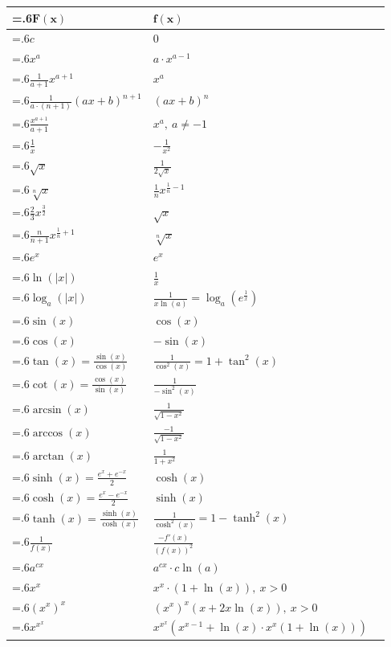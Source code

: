 \documentclass[a4paper, 10pt]{article}
\theoremstyle{definition}
\theoremstyle{ex}
\theoremstyle{named}
\begin{document}
\begin{tabularx}{\linewidth}{>{\hsize=.6\hsize\centering\arraybackslash}X|>{\centering\arraybackslash}XX}
    $\mathbf{F(x)}$ & $\mathbf{f(x)}$ \\
    \midrule
    $c$ & $0$ \\
    $x^a$ & $a \cdot x^{a - 1}$ \\
    $\frac{1}{a+1} x^{a + 1}$ & $x^a$ \\
    $\frac{1}{a \cdot (n + 1)} (ax + b)^{n + 1}$ & $(ax + b)^n$ \\
    $\frac{x^{a + 1}}{a + 1}$ & $x^a, \ a \neq -1$ \\
    $\frac{1}{x}$ & $-\frac{1}{x^2}$ \\
    $\sqrt{x}$ & $\frac{1}{2\sqrt{x}}$ \\
    $\sqrt[n]{x}$ & $\frac{1}{n}x^{\frac{1}{n} - 1}$ \\
    $\frac{2}{3}x^{\frac{3}{2}}$ & $\sqrt{x}$ \\
    $\frac{n}{n+1} x^{\frac{1}{n} + 1}$ & $\sqrt[n]{x}$ \\
    $e^x$ & $e^x$ \\
    $\ln(|x|)$ & $\frac{1}{x}$ \\
    $\log_a(|x|)$ & $\frac{1}{x \ln(a)} = \log_a(e^\frac{1}{x})$ \\
    $\sin(x)$ & $\cos(x)$ \\
    $\cos(x)$ & $-\sin(x)$ \\
    $\tan(x) = \frac{\sin(x)}{\cos(x)}$ & $\frac{1}{\cos^2(x)} = 1 + \tan^2(x)$ \\
    $\cot(x) = \frac{\cos(x)}{\sin(x)}$ & $\frac{1}{-\sin^2(x)}$ \\
    $\arcsin(x)$ & $\frac{1}{\sqrt{1 - x^2}}$ \\
    $\arccos(x)$ & $\frac{-1}{\sqrt{1 - x^2}}$ \\
    $\arctan(x)$ & $\frac{1}{1 + x^2}$ \\
    $\sinh(x) = \frac{e^x + e^{-x}}{2}$ & $\cosh(x)$ \\
    $\cosh(x) = \frac{e^x - e^{-x}}{2}$ & $\sinh(x)$ \\
    $\tanh(x) = \frac{\sinh(x)}{\cosh(x)}$ & $\frac{1}{\cosh^2(x)} = 1 - \tanh^2(x)$ \\
    $\frac{1}{f(x)}$ & $\frac{-f'(x)}{(f(x))^2}$ \\
    $a^{cx}$ & $a^{cx} \cdot c \ln(a)$ \\
    $x^x$ & $x^x \cdot (1 + \ln(x)), \ x > 0$ \\
    $(x^x)^x$ & $(x^x)^x (x + 2x \ln(x)), \ x > 0$ \\
    $x^{x^x}$ & $x^{x^x} (x^{x - 1} + \ln(x) \cdot x^x (1 + \ln(x)))$ \\
\end{tabularx}
\end{document}
